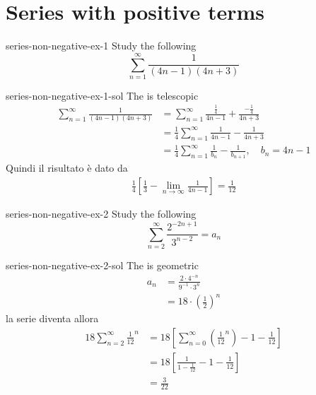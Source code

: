 \documentclass[preview]{standalone}
\begin{document}
\genpage

\section{Series with positive terms}

\begin{snippetexercise}{series-non-negative-ex-1}{}
    Study the following \series
    \[
        \sum_{n=1}^\infty \frac{1}{(4n-1)(4n+3)}
    \]
\end{snippetexercise}

\begin{snippetsolution}{series-non-negative-ex-1-sol}{}
    The \series is telescopic
    \begin{align*}
        \sum_{n=1}^\infty \frac{1}{(4n-1)(4n+3)}
        &= \sum_{n=1}^\infty
        \frac{\frac{1}{4}}{4n-1} + \frac{-\frac{1}{4}}{4n+3} \\
        &= \frac{1}{4} \sum_{n=1}^\infty
        \frac{1}{4n-1} - \frac{1}{4n+3} \\
        &= \frac{1}{4} \sum_{n=1}^\infty
        \frac{1}{b_n} - \frac{1}{b_{n+1}}, \quad b_n = 4n-1 
    \end{align*}
    Quindi il risultato è dato da
    \begin{align*}
        \frac{1}{4} \left[
            \frac{1}{3} - \lim_{n\to \infty} \frac{1}{4n-1}
        \right] = \frac{1}{12}
    \end{align*}
\end{snippetsolution}

\begin{snippetexercise}{series-non-negative-ex-2}{}
    Study the following \series
    \[
        \sum_{n=2}^\infty \frac{2^{-2n+1}}{3^{n-2}} = a_n
    \]
\end{snippetexercise}

\begin{snippetsolution}{series-non-negative-ex-2-sol}{}
    The \series is geometric
    \begin{align*}
        a_n &= \frac{2 \cdot 4^{-n}}{9^{-1} \cdot 3^n} \\
        &= 18 \cdot {\left(\frac{1}{2}\right)}^n       
    \end{align*}
    la serie diventa allora
    \begin{align*}
        18 \sum_{n=2}^\infty {\frac{1}{12}}^n
        &= 18 \left[\sum_{n=0}^\infty \left({\frac{1}{12}}^n\right) - 1 - \frac{1}{12}\right]
        \\
        &= 18 \left[ \frac{1}{1 - \frac{1}{12}} - 1 - \frac{1}{12} \right] \\
        &= \frac{3}{22}
    \end{align*}
\end{snippetsolution}
\end{document}
